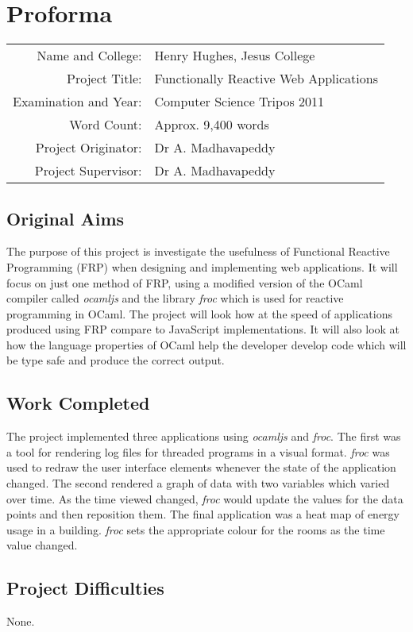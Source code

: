\chapter{Proforma}
\begin{center}
\begin{tabular}{r l}
Name and College: & Henry Hughes, Jesus College\\
Project Title: & Functionally Reactive Web Applications\\
Examination and Year: & Computer Science Tripos 2011\\
Word Count: & Approx. 9,400 words\\
Project Originator: & Dr A. Madhavapeddy\\
Project Supervisor: & Dr A. Madhavapeddy\\
\end{tabular}
\end{center}

\section*{Original Aims}
The purpose of this project is investigate the usefulness of Functional Reactive Programming (FRP) when designing and implementing web applications. It will focus on just one method of FRP, using a modified version of the OCaml compiler called \emph{ocamljs} and the library \emph{froc} which is used for reactive programming in OCaml. The project will look how at the speed of applications produced using FRP compare to JavaScript implementations. It will also look at how the language properties of OCaml help the developer develop code which will be type safe and produce the correct output. %

\section*{Work Completed}
The project implemented three applications using \emph{ocamljs} and \emph{froc}. The first was a tool for rendering log files for threaded programs in a visual format. \emph{froc} was used to redraw the user interface elements whenever the state of the application changed. The second rendered a graph of data with two variables which varied over time. As the time viewed changed, \emph{froc} would update the values for the data points and then reposition them. The final application was a heat map of energy usage in a building. \emph{froc} sets the appropriate colour for the rooms as the time value changed. %


\section*{Project Difficulties}
None.
